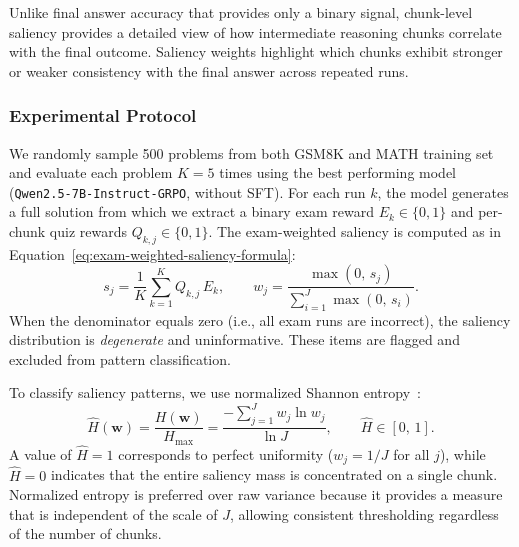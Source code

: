 \documentclass[12pt]{report}
\begin{document}
Unlike final answer accuracy that provides only a binary signal, chunk-level
saliency provides a detailed view of how intermediate reasoning chunks
correlate with the final outcome.  Saliency weights highlight which chunks
exhibit stronger or weaker consistency with the final answer across repeated
runs.

\subsubsection{Experimental Protocol}
\label{sec:saliency-protocol}

We randomly sample 500 problems from both GSM8K and MATH training set and evaluate each problem $K = 5$ times using the
best performing model
(\texttt{Qwen2.5-7B-Instruct-GRPO}, without SFT).
For each run $k$, the model generates a full solution from which we extract
a binary exam reward $E_k \in \{0, 1\}$ and
per-chunk quiz rewards $Q_{k,j} \in \{0, 1\}$.
The exam-weighted saliency is computed as in Equation~\ref{eq:exam-weighted-saliency-formula}:
\[
    s_j = \frac{1}{K}\sum_{k=1}^{K} Q_{k,j}\,E_k,
    \qquad
    w_j = \frac{\max(0,\,s_j)}{\sum_{i=1}^{J}\max(0,\,s_i)}.
\]
When the denominator equals zero (i.e., all exam runs are incorrect), the
saliency distribution is \emph{degenerate} and uninformative. These items are
flagged and excluded from pattern classification.

To classify saliency patterns, we use normalized Shannon entropy~\cite{shannon1948mathematical}:
\[
    \hat{H}(\mathbf{w})
    = \frac{H(\mathbf{w})}{H_{\max}}
    = \frac{-\sum_{j=1}^{J} w_j \ln w_j}{\ln J},
    \qquad \hat{H} \in [0,\,1].
\]
A value of $\hat{H} = 1$ corresponds to perfect uniformity
($w_j = 1/J$ for all $j$), while $\hat{H} = 0$ indicates that the
entire saliency mass is concentrated on a single chunk.
Normalized entropy is preferred over raw variance because it provides a
measure that is independent of the scale of $J$, allowing consistent
thresholding regardless of the number of chunks.
\end{document}
